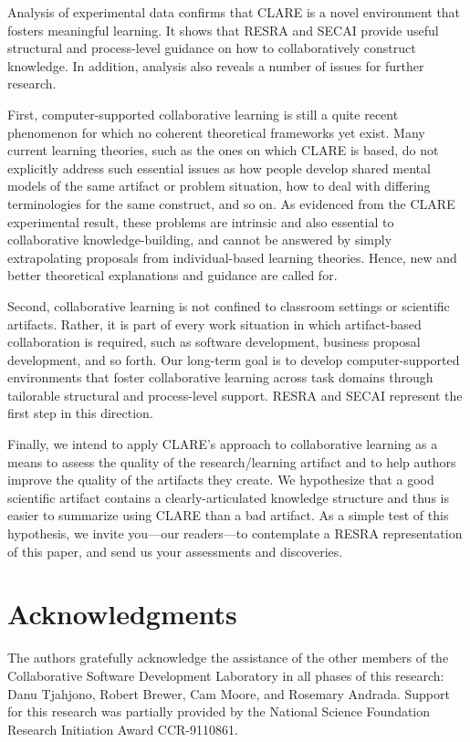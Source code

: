 Analysis of experimental data confirms that CLARE is a novel environment
that fosters meaningful learning. It shows that RESRA and SECAI provide
useful structural and process-level guidance on how to collaboratively
construct knowledge. In addition, analysis also reveals a number of issues
for further research.

First, computer-supported collaborative learning is still a quite recent
phenomenon for which no coherent theoretical frameworks yet exist. Many
current learning theories, such as the ones on which CLARE is based, do not
explicitly address such essential issues as how people develop shared
mental models of the same artifact or problem situation, how to deal with
differing terminologies for the same construct, and so on. As evidenced
from the CLARE experimental result, these problems are intrinsic and also
essential to collaborative knowledge-building, and cannot be answered by
simply extrapolating proposals from individual-based learning
theories. Hence, new and better theoretical explanations and guidance are
called for.

Second, collaborative learning is not confined to classroom settings or
scientific artifacts. Rather, it is part of every work situation in which
artifact-based collaboration is required, such as software development,
business proposal development, and so forth. Our long-term goal is to
develop computer-supported environments that foster collaborative learning
across task domains through tailorable structural and process-level
support. RESRA and SECAI represent the first step in this direction.

Finally, we intend to apply CLARE's approach to collaborative learning as a
means to assess the quality of the research/learning artifact and to help
authors improve the quality of the artifacts they create. We hypothesize
that a good scientific artifact contains a clearly-articulated knowledge
structure and thus is easier to summarize using CLARE than a bad artifact.
As a simple test of this hypothesis, we invite you---our readers---to
contemplate a RESRA representation of this paper, and send us your
assessments and discoveries.


\section{Acknowledgments}
\label{sec:acks}

The authors gratefully acknowledge the assistance of the other members of
the Collaborative Software Development Laboratory in all phases of this
research: Danu Tjahjono, Robert Brewer, Cam Moore, and Rosemary Andrada.
Support for this research was partially provided by the National Science
Foundation Research Initiation Award CCR-9110861.


